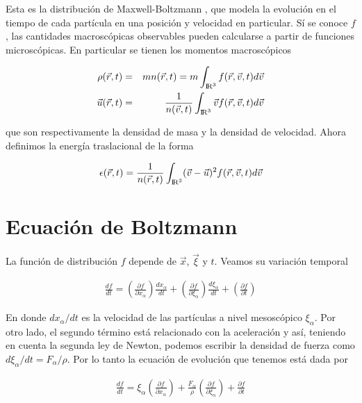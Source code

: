 
\noindent Esta es la distribución de Maxwell-Boltzmann , que modela la evolución en el tiempo de cada partícula en una posición y velocidad en particular. Sí se conoce $f$, las cantidades macroscópicas observables pueden calcularse a partir de funciones microscópicas. En particular se tienen los momentos macroscópicos  \cite{lecture1}

\begin{eqnarray}
\rho(\vec{r},t)&=&mn(\vec{r},t)=m\int_{{\rm I\!R}^{3}}f(\vec{r},\vec{v},t)d\vec{v}\\
\vec{u}(\vec{r},t) &=& \frac{1}{n(\vec{v},t)}\int_{{\rm I\!R}^{3}}\vec{v} f(\vec{r},\vec{v},t)d\vec{v}
\end{eqnarray}

\noindent que son respectivamente la densidad de masa y la densidad de velocidad. Ahora definimos la energía traslacional de la forma

\begin{eqnarray}
\epsilon(\vec{r},t)=\frac{1}{n(\vec{r},t)}\int_{{\rm I\!R}^{3}}(\vec{v}-\vec{u})^{2}f(\vec{r},\vec{v},t)d\vec{v}
\end{eqnarray}




\section{Ecuación de Boltzmann}



\noindent La función de distribución $f$ depende  de $\vec{x}$, $\vec{\xi}$ y $t$. Veamos su variación temporal

\begin{eqnarray}
\frac{df}{dt} = \left(\frac{\partial f}{\partial x_{\alpha}}\right)\frac{dx_{\alpha}}{dt}+\left(\frac{\partial f}{\partial \xi_{\alpha}}\right)\frac{d\xi_{\alpha}}{dt}+\left(\frac{\partial f}{\partial t}\right)
\end{eqnarray}

\noindent En donde $dx_{\alpha}/dt$ es la velocidad de las partículas a nivel mesoscópico $\xi_{\alpha}$. Por otro lado, el segundo término está relacionado con la aceleración y así, teniendo en cuenta la segunda ley de Newton, podemos escribir la densidad de fuerza como $d\xi_{\alpha}/dt = F_{\alpha}/\rho$. Por lo tanto la ecuación de evolución que tenemos está dada por 

\begin{eqnarray}
\frac{df}{dt} = \xi_{\alpha}\left(\frac{\partial f}{\partial x_{\alpha}}\right)+\frac{F_{\alpha}}{\rho}\left(\frac{\partial f}{\partial \xi_{\alpha}}\right)+\frac{\partial f}{\partial t}
\end{eqnarray}

